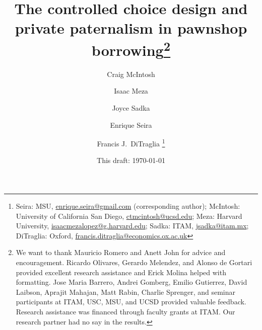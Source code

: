 \documentclass[11pt, a4paper]{article}
\begin{document}
\title{The controlled choice design and private paternalism in pawnshop borrowing\thanks{We want to thank Mauricio Romero and Anett John for advice and encouragement. Ricardo Olivares, Gerardo Melendez, and Alonso de Gortari provided excellent research assistance and Erick Molina helped with formatting. Jose Maria Barrero, Andrei Gomberg, Emilio Gutierrez, David Laibson, Aprajit Mahajan, Matt Rabin, Charlie Sprenger, and seminar participants at ITAM, USC, MSU, and UCSD provided valuable feedback. Research assistance was financed through faculty grants at ITAM. Our research partner had no say in the results.}}
\author{Craig McIntosh \and Isaac Meza \and Joyce Sadka \and Enrique Seira \and Francis J.\ DiTraglia   \thanks{Seira:  MSU, \url{enrique.seira@gmail.com} (corresponding author); McIntosh:  University of California San Diego, \url{ctmcintosh@ucsd.edu}; Meza: Harvard University, \url{isaacmezalopez@g.harvard.edu}; Sadka: ITAM, \url{jsadka@itam.mx}; DiTraglia: Oxford, \url{francis.ditraglia@economics.ox.ac.uk}} }
\date{This draft:  \today \\[2 cm]}



\maketitle
\vspace{-0.75in}
\end{document}
